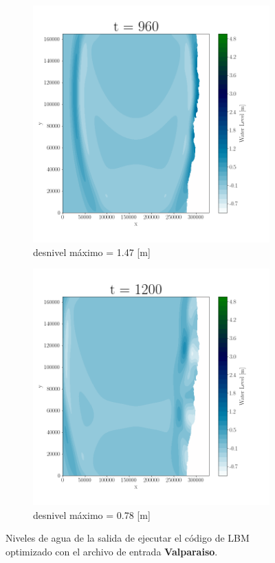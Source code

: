 \begin{figure}[H]
\begin{subfigure}[b]{.4\linewidth}
\includegraphics[width=\linewidth]{Figures/Plots/Valpo5.png}
\caption{desnivel máximo = 1.47 [m]}
\end{subfigure}
\begin{subfigure}[b]{.4\linewidth}
\includegraphics[width=\linewidth]{Figures/Plots/Valpo6.png}
\caption{desnivel máximo = 0.78 [m]}
\end{subfigure}
\caption{Niveles de agua de la salida de ejecutar el código de LBM optimizado con el archivo de entrada \textbf{Valparaiso}.}
\label{fig:27}
\end{figure}